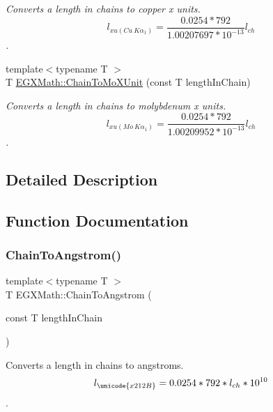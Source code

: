 \begin{DoxyCompactItemize}
\begin{DoxyCompactList}\small\item\em Converts a length in chains to copper x units. \[ l_{xu(Cu\ K\alpha_1)}=\frac{0.0254 * 792}{1.00207697*10^{-13}} l_{ch}\]. \end{DoxyCompactList}\item 
{\footnotesize template$<$typename T $>$ }\\T \mbox{\hyperlink{group___e_g_x_math-_conversions-_length_conversions-_imperial-_chain-_non-_s_i_gae4a2b99d846db53416e9fc5d6f9e957c}{E\+G\+X\+Math\+::\+Chain\+To\+Mo\+X\+Unit}} (const T length\+In\+Chain)
\begin{DoxyCompactList}\small\item\em Converts a length in chains to molybdenum x units. \[ l_{xu(Mo\ K\alpha_1)}=\frac{0.0254 * 792}{1.00209952*10^{-13}} l_{ch}\]. \end{DoxyCompactList}\end{DoxyCompactItemize}


\subsection{Detailed Description}


\subsection{Function Documentation}
\mbox{\label{group___e_g_x_math-_conversions-_length_conversions-_imperial-_chain-_non-_s_i_ga89e870762310908510aad80d26dc1942}} 
\subsubsection{\texorpdfstring{Chain\+To\+Angstrom()}{ChainToAngstrom()}}
{\footnotesize\ttfamily template$<$typename T $>$ \\
T E\+G\+X\+Math\+::\+Chain\+To\+Angstrom (\begin{DoxyParamCaption}\item[{const T}]{length\+In\+Chain }\end{DoxyParamCaption})}



Converts a length in chains to angstroms. \[ l_{\unicode{x212B}}=0.0254 * 792 * l_{ch} * 10^{10} \]. 

